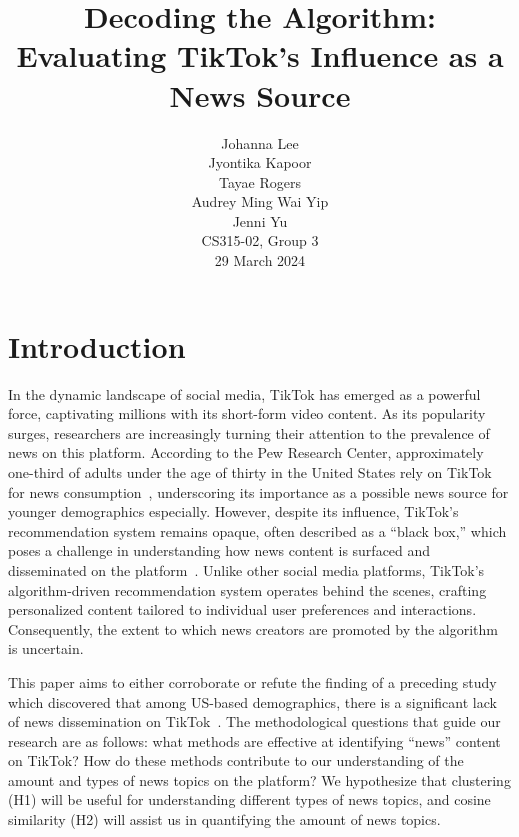 \documentclass{article}
\title{Decoding the Algorithm: \\
       Evaluating TikTok's Influence as a News Source}
\author{
    Johanna Lee \\
    Jyontika Kapoor \\
    Tayae Rogers \\ 
    Audrey Ming Wai Yip \\
    Jenni Yu \\
    \vspace{2em} %
    CS315-02, Group 3 \\
    29 March 2024
}
\begin{document}
\linespread{1.1}
\begin{titlingpage}
\pagestyle{empty} %
\centering %
\maketitle
\end{titlingpage}
\restoregeometry %
\newpage
\tableofcontents
\newpage


\section{Introduction}
In the dynamic landscape of social media, TikTok has emerged as a powerful 
force, captivating millions with its short-form video content. As its 
popularity surges, researchers are increasingly turning their attention to the 
prevalence of news on this platform. According to the Pew Research Center, 
approximately one-third of adults under the age of thirty in the United States 
rely on TikTok for news consumption~\cite{pewresearch2023}, underscoring its 
importance as a possible news source for younger demographics especially. 
However, despite its influence, TikTok's recommendation system remains opaque, 
often described as a “black box,” which poses a challenge in understanding how 
news content is surfaced and disseminated on the platform~\cite
{boeker2022empirical}. Unlike other social media platforms, TikTok's 
algorithm-driven recommendation system operates behind the scenes, crafting 
personalized content tailored to individual user preferences and interactions. 
Consequently, the extent to which news creators are promoted by the algorithm 
is uncertain. \newline

{\noindent}This paper aims to either corroborate or refute the finding of a preceding study which discovered that among US-based demographics, there is a 
significant lack of news dissemination on TikTok~\cite{hagar2023algorithmic}. 
The methodological questions that guide our research are as follows: what 
methods are effective at identifying “news” content on TikTok? How do these 
methods contribute to our understanding of the amount and types of news topics 
on the platform? We hypothesize that clustering (H1) will be useful for 
understanding different types of news topics, and cosine similarity (H2) will assist us in quantifying the amount of news topics.\newline
\end{document}
